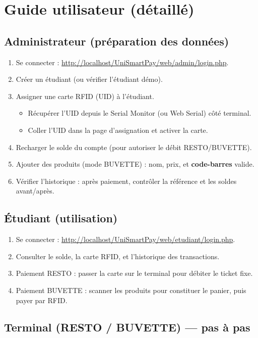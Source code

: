 \documentclass[11pt,a4paper]{article}
\begin{document}
\section{Guide utilisateur (détaillé)}
\subsection{Administrateur (préparation des données)}
\begin{enumerate}
  \item Se connecter : \url{http://localhost/UniSmartPay/web/admin/login.php}.
  \item Créer un étudiant (ou vérifier l’étudiant démo).
  \item Assigner une carte RFID (UID) à l’étudiant.
  \begin{itemize}
    \item Récupérer l’UID depuis le Serial Monitor (ou Web Serial) côté terminal.
    \item Coller l’UID dans la page d’assignation et activer la carte.
  \end{itemize}
  \item Recharger le solde du compte (pour autoriser le débit RESTO/BUVETTE).
  \item Ajouter des produits (mode BUVETTE) : nom, prix, et \textbf{code-barres} valide.
  \item Vérifier l’historique : après paiement, contrôler la référence et les soldes avant/après.
\end{enumerate}

\subsection{Étudiant (utilisation)}
\begin{enumerate}
  \item Se connecter : \url{http://localhost/UniSmartPay/web/etudiant/login.php}.
  \item Consulter le solde, la carte RFID, et l’historique des transactions.
  \item Paiement RESTO : passer la carte sur le terminal pour débiter le ticket fixe.
  \item Paiement BUVETTE : scanner les produits pour constituer le panier, puis payer par RFID.
\end{enumerate}

\subsection{Terminal (RESTO / BUVETTE) — pas à pas}
\end{document}
